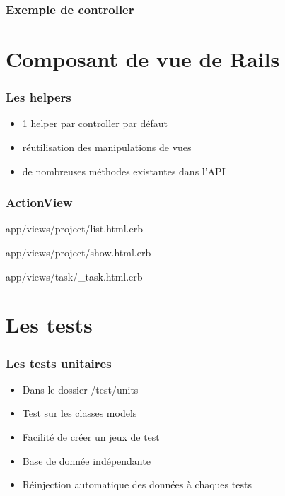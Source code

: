 \documentclass{beamer}
\begin{document}
\begin{frame}
    \frametitle{Exemple de controller}
    
\end{frame}

\section{Composant de vue de Rails}

\begin{frame}
    \frametitle{Les helpers}

    \begin{itemize}
        \item 1 helper par controller par défaut
        \item réutilisation des manipulations de vues
        \item de nombreuses méthodes existantes dans l'API
    \end{itemize}
\end{frame}

\begin{frame}
    \frametitle{ActionView}
    \begin{block}{app/views/project/list.html.erb}
        
    \end{block}
    \begin{block}{app/views/project/show.html.erb}
        
    \end{block}
    \begin{block}{app/views/task/\_task.html.erb}
        
    \end{block}
\end{frame}


\section{Les tests}

\begin{frame}
    \frametitle{Les tests unitaires}
    \begin{itemize}
        \item Dans le dossier /test/units
        \item Test sur les classes models
        \item Facilité de créer un jeux de test
        \item Base de donnée indépendante
        \item Réinjection automatique des données à chaques tests
    \end{itemize}
\end{frame}
\end{document}
